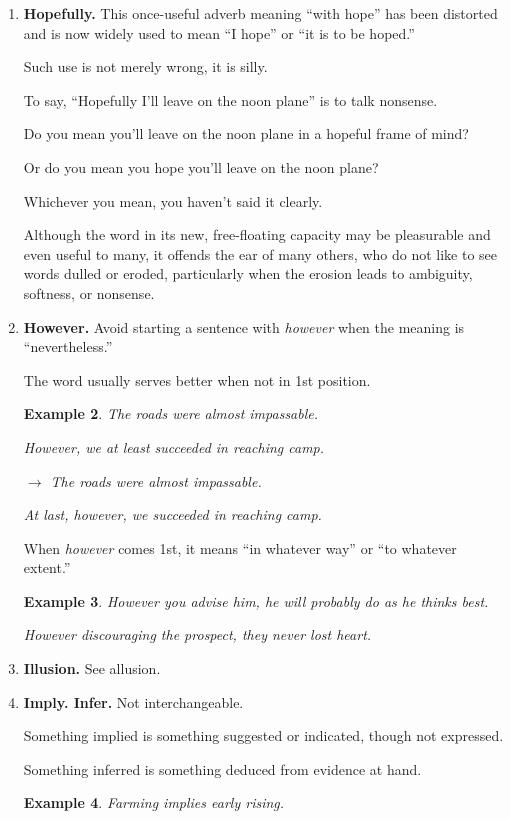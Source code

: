 \documentclass{article}
\newtheorem{example}{Example}
\begin{document}
\begin{enumerate}
\begin{example}
		$\to$ Vermont attracts visitors because of its winter sports.
	\end{example}
	\item {\bf Hopefully.} This once-useful adverb meaning ``with hope'' has been distorted and is now widely used to mean ``I hope'' or ``it is to be hoped.''
	
	Such use is not merely wrong, it is silly.
	
	To say, ``Hopefully I'll leave on the noon plane'' is to talk nonsense.
	
	Do you mean you'll leave on the noon plane in a hopeful frame of mind?
	
	Or do you mean you hope you'll leave on the noon plane?
	
	Whichever you mean, you haven't said it clearly.
	
	Although the word in its new, free-floating capacity may be pleasurable and even useful to many, it offends the ear of many others, who do not like to see words dulled or eroded, particularly when the erosion leads to ambiguity, softness, or nonsense.
	\item {\bf However.} Avoid starting a sentence with {\it however} when the meaning is ``nevertheless.''
	
	The word usually serves better when not in 1st position.
	\begin{example}
		The roads were almost impassable.
		
		However, we at least succeeded in reaching camp.
		
		$\to$ The roads were almost impassable.
		
		At last, however, we succeeded in reaching camp.
	\end{example}
	When {\it however} comes 1st, it means ``in whatever way'' or ``to whatever extent.''
	\begin{example}
		However you advise him, he will probably do as he thinks best.
		
		However discouraging the prospect, they never lost heart.
	\end{example}
	\item {\bf Illusion.} See allusion.
	\item {\bf Imply. Infer.} Not interchangeable.
	
	Something implied is something suggested or indicated, though not expressed.
	
	Something inferred is something deduced from evidence at hand.
	\begin{example}
		Farming implies early rising.
		

\end{example}
\end{enumerate}
\end{document}
